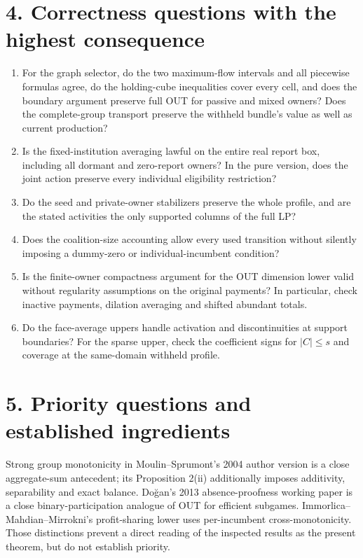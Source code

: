 \documentclass[11pt]{article}
\begin{document}
\section*{4. Correctness questions with the highest consequence}
\begin{enumerate}
\item For the graph selector, do the two maximum-flow intervals and all
piecewise formulas agree, do the holding-cube inequalities cover every cell,
and does the boundary argument preserve full OUT for passive and mixed owners?
Does the complete-group transport preserve the withheld bundle's value as well
as current production?
\item Is the fixed-institution averaging lawful on the entire real report
box, including all dormant and zero-report owners? In the pure version, does
the joint action preserve every individual eligibility restriction?
\item Do the seed and private-owner stabilizers preserve the whole profile,
and are the stated activities the only supported columns of the full LP?
\item Does the coalition-size accounting allow every used transition without
silently imposing a dummy-zero or individual-incumbent condition?
\item Is the finite-owner compactness argument for the OUT dimension lower
valid without regularity assumptions on the original payments? In particular,
check inactive payments, dilation averaging and shifted abundant totals.
\item Do the face-average uppers handle activation and discontinuities at
support boundaries? For the sparse upper, check the coefficient signs for
$|C|\le s$ and coverage at the same-domain withheld profile.
\end{enumerate}

\section*{5. Priority questions and established ingredients}
Strong group monotonicity in Moulin--Sprumont's 2004 author version is a
close aggregate-sum antecedent; its Proposition 2(ii) additionally imposes
additivity, separability and exact balance. Do\u{g}an's 2013 absence-proofness
working paper is a close binary-participation analogue of OUT for efficient
subgames. Immorlica--Mahdian--Mirrokni's profit-sharing lower uses
per-incumbent cross-monotonicity. Those distinctions prevent a direct reading
of the inspected results as the present theorem, but do not establish priority.
\end{document}
